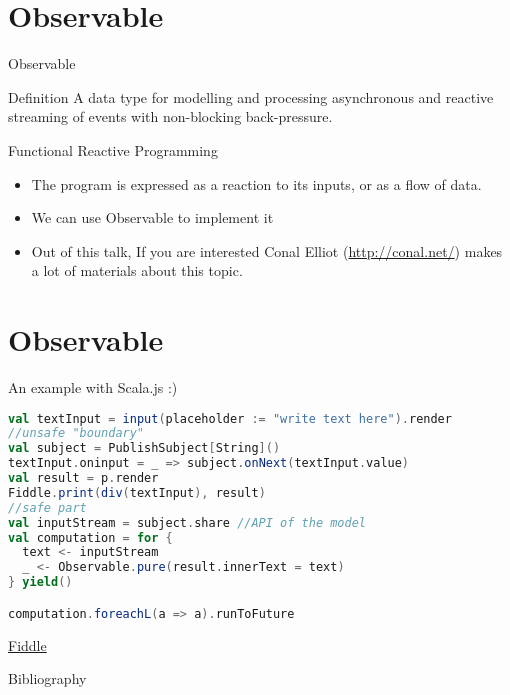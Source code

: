 \documentclass[presentation]{beamer}
\begin{document}
\section{Observable}
\begin{frame}[fragile]{Observable}

\begin{block}{Definition}
A data type for modelling and processing asynchronous and reactive streaming of events with non-blocking back-pressure.
\end{block}

\begin{block}{Functional Reactive Programming}
  \begin{itemize}
    \item The program is expressed as a reaction to its inputs, or as a flow of data.
    \item We can use Observable to implement it
    \item Out of this talk, If you are interested Conal Elliot (\url{http://conal.net/}) makes a lot of materials about this topic.
  \end{itemize}
\end{block}

\end{frame}

\section{Observable}
\begin{frame}[fragile]{An example with Scala.js :)}
\begin{lstlisting}[language=Scala]
val textInput = input(placeholder := "write text here").render
//unsafe "boundary"
val subject = PublishSubject[String]() 
textInput.oninput = _ => subject.onNext(textInput.value)
val result = p.render
Fiddle.print(div(textInput), result)
//safe part
val inputStream = subject.share //API of the model
val computation = for {
  text <- inputStream
  _ <- Observable.pure(result.innerText = text)
} yield()

computation.foreachL(a => a).runToFuture
\end{lstlisting}  
\begin{center}
  \href{https://scalafiddle.io/sf/0uDr1Cr/1}{Fiddle}
\end{center}

\end{frame}

\begin{frame}[allowframebreaks]{Bibliography}
\def\bibfont{\footnotesize}
\printbibliography
\end{frame}
\end{document}
